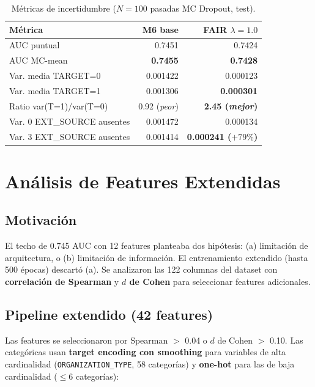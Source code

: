 \documentclass[12pt,a4paper]{article}
\begin{document}
\begin{table}[H]
\centering
\caption{Métricas de incertidumbre ($N=100$ pasadas MC Dropout, test).}
\label{tab:uncertainty}
\begin{tabular}{@{}lrr@{}}
\toprule
\textbf{Métrica} & \textbf{M6 base} & \textbf{FAIR $\lambda=1.0$} \\
\midrule
AUC puntual                       & 0.7451 & 0.7424 \\
AUC MC-mean                       & \textbf{0.7455} & \textbf{0.7428} \\
\midrule
Var. media TARGET=0               & 0.001422 & 0.000123 \\
Var. media TARGET=1               & 0.001306 & \textbf{0.000301} \\
Ratio var(T=1)/var(T=0)           & 0.92 (\textit{peor}) & \textbf{2.45 (\textit{mejor})} \\
\midrule
Var. 0 EXT\_SOURCE ausentes       & 0.001472 & 0.000134 \\
Var. 3 EXT\_SOURCE ausentes       & 0.001414 & \textbf{0.000241 ($+79\%$)} \\
\bottomrule
\end{tabular}
\end{table}

\section{Análisis de Features Extendidas}
\label{sec:extended}

\subsection{Motivación}

El techo de 0.745 AUC con 12 features planteaba dos hipótesis:
(a) limitación de arquitectura, o (b) limitación de información.
El entrenamiento extendido (hasta 500 épocas) descartó (a).
Se analizaron las 122 columnas del dataset con \textbf{correlación de Spearman}
y \textbf{$d$ de Cohen} para seleccionar features adicionales.

\subsection{Pipeline extendido (42 features)}

Las features se seleccionaron por Spearman $>$ 0.04 o $d$ de Cohen $>$ 0.10.
Las categóricas usan \textbf{target encoding con smoothing} para variables de
alta cardinalidad (\texttt{ORGANIZATION\_TYPE}, 58 categorías) y \textbf{one-hot}
para las de baja cardinalidad ($\leq$6 categorías):
\end{document}
